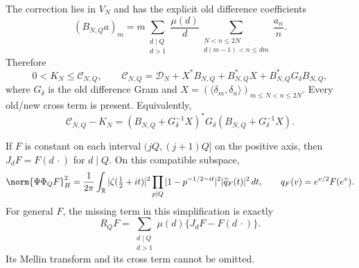 \begin{proposition}
\label{prop:ns60-grid-correction}
The correction lies in $V_N$ and has the explicit old difference
coefficients
\begin{equation}
 (B_{N,Q}a)_m
 =m\sum_{\substack{d\mid Q\\d>1}}\frac{\mu(d)}d
       \sum_{\substack{N<n\leq2N\\d(m-1)<n\leq dm}}\frac{a_n}{n}.
 \label{eq:ns60-correction-matrix}
\end{equation}
Therefore
\begin{equation}
 0<K_N\leq\mathcal C_{N,Q},\qquad
 \mathcal C_{N,Q}
 =\mathcal D_N+X^*B_{N,Q}+B_{N,Q}^*X+B_{N,Q}^*G_\delta B_{N,Q},
 \label{eq:ns60-full-correction-gram}
\end{equation}
where $G_\delta$ is the old difference Gram and
$X=(\langle\delta_m,\delta_n\rangle)_{m\leq N<n\leq2N}$.
Every old/new cross term is present.
Equivalently,
\[
 \mathcal C_{N,Q}-K_N
 =(B_{N,Q}+G_\delta^{-1}X)^*G_\delta
                         (B_{N,Q}+G_\delta^{-1}X).
\]

If $F$ is constant on each interval $(jQ,(j+1)Q]$ on the positive
axis, then $J_dF=F(d\,\cdot)$ for $d\mid Q$. On this compatible
subspace,
\begin{equation}
 \norm{\Psi\Phi_QF}_H^2
 =\frac1{2\pi}\int_{\mathbb R}|\zeta(\tfrac12+it)|^2
       \prod_{p\mid Q}|1-p^{-1/2-it}|^2
       |\widehat q_F(t)|^2\,dt,
 \qquad q_F(v)=e^{v/2}F(e^v).
 \label{eq:ns60-compatible-euler}
\end{equation}
For general $F$, the missing term in this simplification is exactly
\begin{equation}
 R_QF=\sum_{\substack{d\mid Q\\d>1}}\mu(d)
                   \{J_dF-F(d\,\cdot)\}.
 \label{eq:ns60-grid-defect}
\end{equation}
Its Mellin transform and its cross term cannot be omitted.
\end{proposition}
